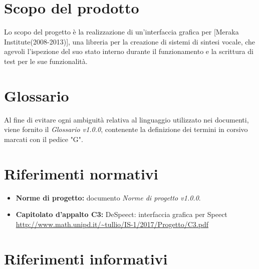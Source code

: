 \documentclass[openany,12pt,a4paper]{report}
\begin{document}
    \section{Scopo del prodotto}
    
    Lo scopo del progetto è la realizzazione di un’interfaccia grafica per  [Meraka Institute(2008-2013)], una libreria per la creazione di sistemi di sintesi vocale, che agevoli l’ispezione del suo stato interno durante il funzionamento e la scrittura di test per le sue funzionalità.
    
    \section{Glossario}
    
    Al fine di evitare ogni ambiguità relativa al linguaggio utilizzato nei documenti, viene fornito il \textit{Glossario v1.0.0}, contenente la definizione dei termini in corsivo marcati con il pedice "G".
    
    \section{Riferimenti normativi}
    
    \begin{itemize}
    
        \item \textbf{Norme di progetto:} documento \textit{Norme di progetto v1.0.0}.
        
        \item\textbf{Capitolato d'appalto C3:} DeSpeect: interfaccia grafica per Speect \\ \url{http://www.math.unipd.it/~tullio/IS-1/2017/Progetto/C3.pdf}
    
    \end{itemize}
    
    \section{Riferimenti informativi}
    
\end{document}
